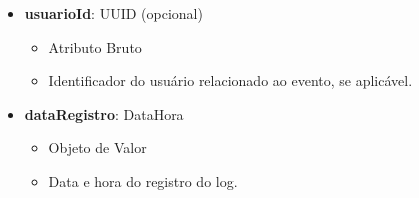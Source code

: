 \begin{itemize}
        \item \textbf{usuarioId}: UUID (opcional)  
              \begin{itemize}
                  \item Atributo Bruto
                  \item Identificador do usuário relacionado ao evento, se aplicável.
              \end{itemize}
    
        \item \textbf{dataRegistro}: DataHora  
              \begin{itemize}
                  \item Objeto de Valor
                  \item Data e hora do registro do log.
              \end{itemize}
    \end{itemize}

    
